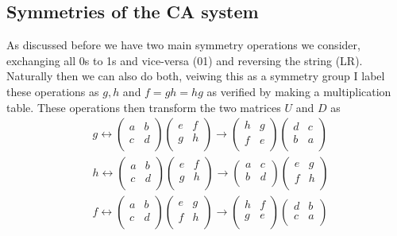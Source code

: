\documentclass[11pt]{article}
\begin{document}
\subsection{Symmetries of the CA system}
As discussed before we have two main symmetry operations we consider, exchanging all 0s to 1s and vice-versa (01) and reversing the string (LR).
Naturally then we can also do both, veiwing this as a symmetry group I label these operations as $g, h$ and $f=gh=hg$ as verified by making a multiplication table.
These operations then transform the two matrices $U$ and $D$ as
\begin{align}
	 & g \leftrightarrow \begin{pmatrix} a & b \\ c & d \\ \end{pmatrix} \begin{pmatrix} e & f \\ g & h \\ \end{pmatrix} \rightarrow \begin{pmatrix} h & g \\ f & e \\ \end{pmatrix} \begin{pmatrix} d & c \\ b & a \\ \end{pmatrix} \\
	 & h \leftrightarrow \begin{pmatrix} a & b \\ c & d \\ \end{pmatrix} \begin{pmatrix} e & f \\ g & h \\ \end{pmatrix} \rightarrow \begin{pmatrix} a & c \\ b & d \\ \end{pmatrix} \begin{pmatrix} e & g \\ f & h \\ \end{pmatrix} \\
	 & f \leftrightarrow \begin{pmatrix} a & b \\ c & d \\ \end{pmatrix} \begin{pmatrix} e & g \\ f & h \\ \end{pmatrix} \rightarrow \begin{pmatrix} h & f \\ g & e \\ \end{pmatrix} \begin{pmatrix} d & b \\ c & a \\ \end{pmatrix}
\end{align}
\end{document}
